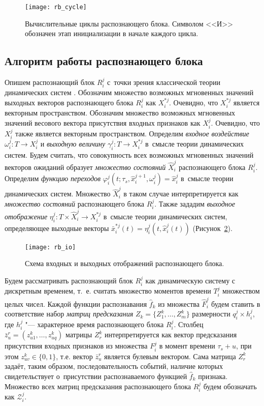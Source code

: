 \begin{figure}[h]
	\centering
	\texttt{[image: rb\_cycle]}
	\caption{Вычислительные циклы распознающего блока. Символом <<И>> обозначен этап инициализации в начале каждого цикла.}
	\label{fig:rb_cycle}  
\end{figure}

\subsection{Алгоритм работы распознающего блока}\label{subsect:rb_algorithm}

Опишем распознающий блок $R_i^j$ с~точки зрения классической теории динамических систем \cite{KalmanE1971,Kalman1971}. Обозначим множество возможных мгновенных значений выходных векторов распознающего блока $R_i^j$ как $X_i^{*j}$. Очевидно, что $X_i^{*j}$ является векторным пространством. Обозначим множество возможных мгновенных значений весового вектора присутствия входных признаков как $X_i^j$. Очевидно, что $X_i^j$ также является векторным пространством. Определим \textit{входное воздействие} $\omega_i^j:T{\to}X_i^j$ и \textit{выходную величину} $\gamma_i^j:T{\to}X_i^{*j}$ в~смысле теории динамических систем. Будем считать, что совокупность всех возможных мгновенных значений векторов ожиданий образует \textit{множество состояний} $\hat{X}_i^j$ распознающего блока $R_i^j$. Определим \textit{функцию переходов} $\varphi_i^j(t;\tau_s,\hat{x}_i^{j+1},\omega_i^j)=\hat{x}_i^j$ в~смысле теории динамических систем. Множество $\hat{X}_i^j$ в таком случае интерпретируется как \textit{множество состояний} распознающего блока $R_i^j$. Также зададим \textit{выходное отображение} $\eta_i^j:T{\times}\hat{X}_i^j{\to}X_i^{*j}$ в~смысле теории динамических систем, определяющее выходные векторы $\bar{x}_i^{*j}(t)=\eta_i^j(t,\hat{x}_i^j(t))$ (Рисунок~\ref{fig:rb_io}).

\begin{figure}[h]
	\centering
	\texttt{[image: rb\_io]}
	\caption{Схема входных и выходных отображений распознающего блока.}
	\label{fig:rb_io}
\end{figure}

Будем рассматривать распознающий блок $R_i^j$ как динамическую систему с дискретным временем, т.~е. считать множество моментов времени $T_i^j$ множеством целых чисел. Каждой функции распознавания $\hat{f}_k$ из множества $\hat{F}_i^j$ будем ставить в соответствие набор \textit{матриц предсказания} $Z_k=\{Z_1^k,…,Z_m^k\}$ размерности $q_i^j\times h_i^j$, где $h_i^j$ "--- характерное время распознающего блока $R_i^j$. Столбец $\bar{z}_u^r=(z_{u1}^k,…,z_{uq}^k)$ матрицы $Z_r^k$ интерпретируется как вектор предсказания присутствия входных признаков из множества $F_i^j$ в момент времени $\tau_s+u$, при этом $z_{uv}^k\in\{0,1\}$, т.е. вектор $\bar{z}_u^r$ является булевым вектором. Сама матрица $Z_r^k$ задаёт, таким образом, последовательность событий, наличие которых свидетельствует о~присутствии распознаваемого функцией $\hat{f}_k$ признака. Множество всех матриц предсказания распознающего блока $R_i^j$ будем обозначать как $\mathcal{Z}_i^j$.

